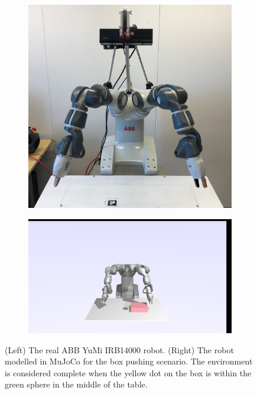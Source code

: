 \begin{figure}%
    \centering
    \begin{subfigure}{0.4\textwidth}
    \includegraphics[width=1\textwidth,trim=0 0 0 0,clip]{img/yumi/yumi-pose-real}
    \end{subfigure}
    \begin{subfigure}{0.4\textwidth}
    \includegraphics[width=1\textwidth,trim=800 240 810 250,clip]{img/yumi/yumi-pose-sim2}
    \end{subfigure}
    \caption{(Left) The real ABB YuMi IRB14000 robot. (Right) The robot modelled in MuJoCo for the box pushing scenario. The environment is considered complete when the yellow dot on the box is within the green sphere in the middle of the table.}
    \label{fig:robots}%
\end{figure}

